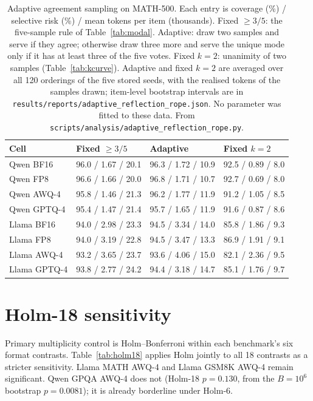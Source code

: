\documentclass[11pt,a4paper]{article}
\begin{document}
\begin{table}[t]
\centering
\caption{Adaptive agreement sampling on MATH-500. Each entry is coverage (\%) / selective risk (\%) / mean tokens per item (thousands). Fixed $\ge 3/5$: the five-sample rule of Table~\ref{tab:modal}. Adaptive: draw two samples and serve if they agree; otherwise draw three more and serve the unique mode only if it has at least three of the five votes. Fixed $k{=}2$: unanimity of two samples (Table~\ref{tab:kcurve}). Adaptive and fixed $k{=}2$ are averaged over all 120 orderings of the five stored seeds, with the realised tokens of the samples drawn; item-level bootstrap intervals are in \texttt{results/reports/adaptive\_reflection\_rope.json}. No parameter was fitted to these data. From \texttt{scripts/analysis/adaptive\_reflection\_rope.py}.}
\label{tab:adaptive}
\small
\begin{tabular}{llll}
\toprule
\textbf{Cell} & \textbf{Fixed $\ge 3/5$} & \textbf{Adaptive} & \textbf{Fixed $k{=}2$} \\
\midrule
Qwen BF16 & 96.0 / 1.67 / 20.1 & 96.3 / 1.72 / 10.9 & 92.5 / 0.89 / 8.0 \\
Qwen FP8 & 96.6 / 1.66 / 20.0 & 96.8 / 1.71 / 10.7 & 92.7 / 0.69 / 8.0 \\
Qwen AWQ-4 & 95.8 / 1.46 / 21.3 & 96.2 / 1.77 / 11.9 & 91.2 / 1.05 / 8.5 \\
Qwen GPTQ-4 & 95.4 / 1.47 / 21.4 & 95.7 / 1.65 / 11.9 & 91.6 / 0.87 / 8.6 \\
\midrule
Llama BF16 & 94.0 / 2.98 / 23.3 & 94.5 / 3.34 / 14.0 & 85.8 / 1.86 / 9.3 \\
Llama FP8 & 94.0 / 3.19 / 22.8 & 94.5 / 3.47 / 13.3 & 86.9 / 1.91 / 9.1 \\
Llama AWQ-4 & 93.2 / 3.65 / 23.7 & 93.6 / 4.06 / 15.0 & 82.1 / 2.36 / 9.5 \\
Llama GPTQ-4 & 93.8 / 2.77 / 24.2 & 94.4 / 3.18 / 14.7 & 85.1 / 1.76 / 9.7 \\
\bottomrule
\end{tabular}
\end{table}

\FloatBarrier
\section{Holm-18 sensitivity}
\label{app:holm18}
Primary multiplicity control is Holm--Bonferroni within each benchmark's six format contrasts. Table~\ref{tab:holm18} applies Holm jointly to all 18 contrasts as a stricter sensitivity. Llama MATH AWQ-4 and Llama GSM8K AWQ-4 remain significant. Qwen GPQA AWQ-4 does not (Holm-18 $p=0.130$, from the $B=10^6$ bootstrap $p=0.0081$); it is already borderline under Holm-6.
\end{document}
